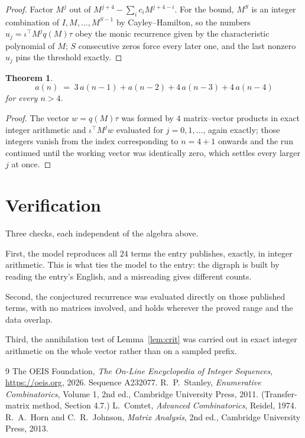 \documentclass[11pt,a4paper]{article}
\theoremstyle{plain}
\newtheorem{theorem}{Theorem}
\theoremstyle{definition}
\begin{document}
\begin{proof}
Factor $M^{j}$ out of $M^{j+4}-\sum_ic_iM^{j+4-i}$. For the bound, $M^{S}$
is an integer combination of $I,M,\dots,M^{S-1}$ by Cayley--Hamilton, so the numbers
$u_j=\iota^{\!\top}M^{j}q(M)\tau$ obey the monic recurrence given by the characteristic
polynomial of $M$; $S$ consecutive zeros force every later one, and the last nonzero $u_j$
pins the threshold exactly.
\end{proof}

\begin{theorem}
\[
a(n)\;=\;3\,a(n-1) + a(n-2) + 4\,a(n-3) + 4\,a(n-4)
\]
for every $n>4$.
\end{theorem}

\begin{proof}
The vector $w=q(M)\tau$ was formed by $4$ matrix--vector products in exact integer
arithmetic and $\iota^{\!\top}M^{j}w$ evaluated for $j=0,1,\dots$, again exactly; those
integers vanish from the index corresponding to $n=4+1$ onwards and the run continued
until the working vector was identically zero, which settles every larger $j$ at once.
\end{proof}

\section{Verification}

Three checks, each independent of the algebra above.

First, the model reproduces all $24$ terms the entry publishes, exactly, in integer
arithmetic. This is what ties the model to the entry: the digraph is built by reading the
entry's English, and a misreading gives different counts.

Second, the conjectured recurrence was evaluated directly on those published terms, with no
matrices involved, and holds wherever the proved range and the data overlap.

Third, the annihilation test of Lemma~\ref{lem:crit} was carried out in exact integer
arithmetic on the whole vector rather than on a sampled prefix.

\begin{thebibliography}{9}
 The OEIS Foundation, \emph{The On-Line Encyclopedia of Integer
Sequences}, \url{https://oeis.org}, 2026. Sequence A232077.
 R.~P.~Stanley, \emph{Enumerative Combinatorics}, Volume 1, 2nd ed.,
Cambridge University Press, 2011. (Transfer-matrix method, Section 4.7.)
 L.~Comtet, \emph{Advanced Combinatorics}, Reidel, 1974.
 R.~A.~Horn and C.~R.~Johnson, \emph{Matrix Analysis}, 2nd ed., Cambridge
University Press, 2013.
\end{thebibliography}
\end{document}
